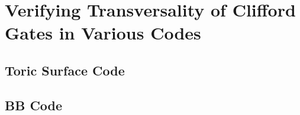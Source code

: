 \chapter{Verifying Transversality of Clifford Gates in Various Codes}\label{app:verifying_transversality}
\section{Toric Surface Code}

\section{BB Code}
